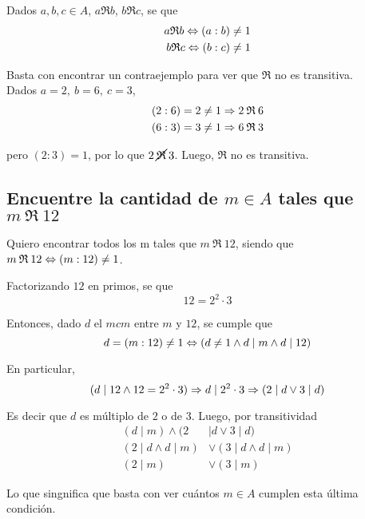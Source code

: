 \documentclass[a4paper,spanish]{article}
\begin{document}
\begin{itemize}
    Dados $a,b,c \in A$, $a\mathfrak{R}b$, $b\mathfrak{R}c$, se que
    \begin{align*}
      a\mathfrak{R}b \Leftrightarrow (a:b) \neq 1 \\
      b\mathfrak{R}c \Leftrightarrow (b:c) \neq 1
    \end{align*}

    Basta con encontrar un contraejemplo para ver que $\mathfrak{R}$ 
    no es transitiva.\\
    Dados $a=2,\> b=6,\> c=3$,
    \begin{align*}
      (2:6) = 2 \neq 1 \Rightarrow 2\>\mathfrak{R}\>6 \\
      (6:3) = 3 \neq 1 \Rightarrow 6\>\mathfrak{R}\>3 \\
    \end{align*}

    pero $(2:3) = 1$, por lo que $2\> \cancel{\mathfrak{R}}\> 3$.
    Luego, $\mathfrak{R}$ no es transitiva.

  \end{itemize}

  \subsection{%
  Encuentre la cantidad de $m \in A$ tales que $m\> \mathfrak{R}\> 12$%
  }

    Quiero encontrar todos los m tales que $m\>\mathfrak{R}\>12$, siendo que  
    $m\>\mathfrak{R}\>12 \Leftrightarrow (m:12) \neq 1$.

    Factorizando $12$ en primos, se que 
    \[
      12 = 2^2 \cdot 3
    \]

    Entonces, dado $d$ el $mcm$ entre $m$ y $12$, se cumple que
    \[
      d = (m:12) \neq 1
      \Leftrightarrow
      (d \neq 1 \land d \mid m \land d \mid 12)
    \] 

    En particular, 
    \[
      (d \mid 12 \land 12=2^2 \cdot 3)
      \Rightarrow d \mid 2^2 \cdot 3 
      \Rightarrow (2 \mid d \lor 3 \mid d)
    \]

    Es decir que $d$ es múltiplo de $2$ o de $3$. Luego, por transitividad
    \begin{align*}
      (d \mid m) \land (2 &\mid d \lor 3 \mid d) \\
      (2\mid d \land d \mid m) &\lor (3 \mid d \land d \mid m) \\
      (2 \mid m)               &\lor (3 \mid m)
    \end{align*}

    Lo que singnifica que basta con ver cuántos $m \in A$ cumplen esta 
    última condición.
\end{document}
